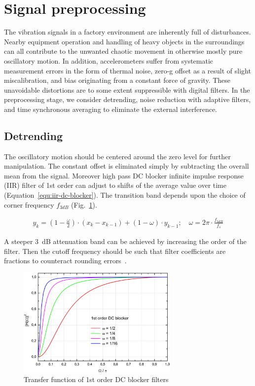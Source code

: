 \section{Signal preprocessing} \label{section:signal-preprocessing}
The vibration signals in a factory environment are inherently full of disturbances. Nearby equipment operation and handling of heavy objects in the surroundings can all contribute to the unwanted chaotic movement in otherwise mostly pure oscillatory motion. In addition, accelerometers suffer from systematic measurement errors in the form of thermal noise, zero-g offset as a result of slight miscalibration, and bias originating from a constant force of gravity. These unavoidable distortions are to some extent suppressible with digital filters. In the preprocessing stage, we consider detrending, noise reduction with adaptive filters, and time synchronous averaging to eliminate the external interference.

\subsection{Detrending}
The oscillatory motion should be centered around the zero level for further manipulation. The constant offset is eliminated simply by subtracting the overall mean from the signal. Moreover high pass DC blocker infinite impulse response (IIR) filter of 1st order can adjust to shifts of the average value over time (Equation~\ref{equ:iir-dc-blocker}). The transition band depends upon the choice of corner frequency $f_{3dB}$ (Fig.~\ref{fig:dc-blocker}).

\begin{ceqn}\begin{align} \label{equ:iir-dc-blocker}
y_k = (1 - \frac{\omega}{2}) \cdot (x_k  -  x_{k - 1}) + (1 - \omega) \cdot y_{k - 1}; \quad \omega = 2\pi \cdot \frac{f_{3dB}}{f_s}
\end{align}\end{ceqn}

A steeper 3~dB attenuation band can be achieved by increasing the order of the filter. Then the cutoff frequency should be such that filter coefficients are fractions to counteract rounding errors~\cite{tittelbach-helmrich_digital_2021}.

\begin{figure}[h]
	\centering
	\includegraphics[width=0.7\textwidth]{assets/iir-1-dc-blocker-band.jpg}
	\caption{Transfer function of 1st order DC blocker filters ~\cite{tittelbach-helmrich_digital_2021}}
	\label{fig:dc-blocker}
\end{figure}

